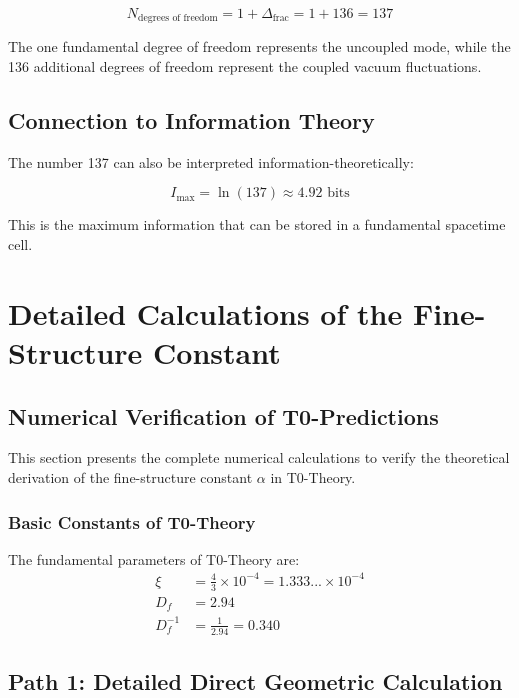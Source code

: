 \documentclass[12pt,a4paper]{article}
\theoremstyle{definition}
\begin{document}
	\begin{equation}
		N_{\text{degrees of freedom}} = 1 + \Delta_{\text{frac}} = 1 + 136 = 137
	\end{equation}
	
	The one fundamental degree of freedom represents the uncoupled mode, while the 136 additional degrees of freedom represent the coupled vacuum fluctuations.
	
	\subsection{Connection to Information Theory}
	
	The number 137 can also be interpreted information-theoretically:
	
	\begin{equation}
		I_{\text{max}} = \ln(137) \approx 4.92 \text{ bits}
	\end{equation}
	
	This is the maximum information that can be stored in a fundamental spacetime cell.
	
	\section{Detailed Calculations of the Fine-Structure Constant}
	
	\subsection{Numerical Verification of T0-Predictions}
	
	This section presents the complete numerical calculations to verify the theoretical derivation of the fine-structure constant $\alpha$ in T0-Theory.
	
	\subsubsection{Basic Constants of T0-Theory}
	
	The fundamental parameters of T0-Theory are:
	\begin{align}
		\xi &= \frac{4}{3} \times 10^{-4} = 1.333... \times 10^{-4} \\
		D_f &= 2.94 \\
		D_f^{-1} &= \frac{1}{2.94} = 0.340
	\end{align}
	
	\subsection{Path 1: Detailed Direct Geometric Calculation}
	
\end{document}
